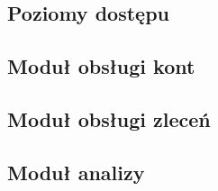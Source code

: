 
\subsection{Poziomy dostępu}




\subsection{Moduł obsługi kont}




\subsection{Moduł obsługi zleceń}




\subsection{Moduł analizy}
